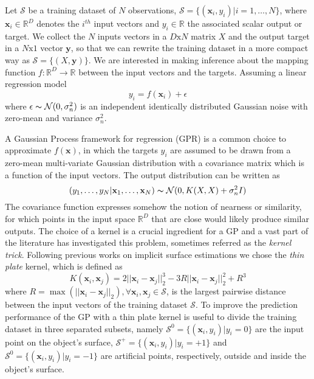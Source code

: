 
Let $\mathcal{S}$ be a training dataset of $N$ observations, $\mathcal{S}=\{(\mathbf{x}_i, y_i)|i=1,\dots,N\}$, where $\mathbf{x}_i\in\mathbb{R}^D$ denotes the $i^{th}$ input vectors and $y_i\in\mathbb{R}$ the associated scalar output or target.  We collect the $N$ inputs vectors in a $D\text{x}N$ matrix $X$ and the output target in a $N\text{x}1$ vector $\mathbf{y}$, so that we can rewrite the training dataset in a more compact way as $\mathcal{S}=\{(X,\mathbf{y})\}$. We are interested in making inference about the mapping function $f:\mathbb{R}^D\rightarrow\mathbb{R}$ between the input vectors and the targets. Assuming a linear regression model
$$
y_i=f(\mathbf{x}_i)+\epsilon
$$
where $\epsilon\thicksim\mathcal{N}(0,\sigma_n^2)$ is an independent identically distributed Gaussian noise with zero-mean and variance $\sigma_n^2$. 

A Gaussian Process framework for regression (GPR) is a common choice to approximate $f(\mathbf{x})$, in which the targets $y_i$ are assumed to be drawn from a zero-mean multi-variate Gaussian distribution with a covariance matrix which is a function of the input vectors. The output distribution can be written as
$$
(y_1,\dots,y_N|\mathbf{x}_1,\dots,\mathbf{x}_N)\thicksim\mathcal{N}(0,K(X,X)+\sigma_n^2I)
$$
The covariance function expresses somehow the notion of nearness or similarity, for which points in the input space $\mathbb{R}^D$ that are close would likely produce similar outputs. The choice of a kernel is a crucial ingredient for a GP and a vast part of the literature has investigated this problem, sometimes referred as the \emph{kernel trick}. Following previous works on implicit surface estimations we chose the \emph{thin plate} kernel, which is defined as
$$
K(\mathbf{x}_i,\mathbf{x}_j)=2||\mathbf{x}_i-\mathbf{x}_j||_2^3-3R||\mathbf{x}_i-\mathbf{x}_j||_2^2+R^3
$$
where $R=\max(||\mathbf{x}_i-\mathbf{x}_j||_2),\forall\mathbf{x}_i,\mathbf{x}_j\in\mathcal{S}$, is the largest pairwise distance between the input vectors of the training dataset $\mathcal{S}$. To improve the prediction performance of the GP with a thin plate kernel is useful to divide the training dataset in three separated subsets, namely $\mathcal{S}^0=\{(\mathbf{x}_i,y_i)|y_i=0\}$ are the input point on the object's surface, $\mathcal{S}^+=\{(\mathbf{x}_i,y_i)|y_i=+1\}$ and $\mathcal{S}^0=\{(\mathbf{x}_i,y_i)|y_i=-1\}$ are artificial points, respectively, outside and inside the object's surface. 

